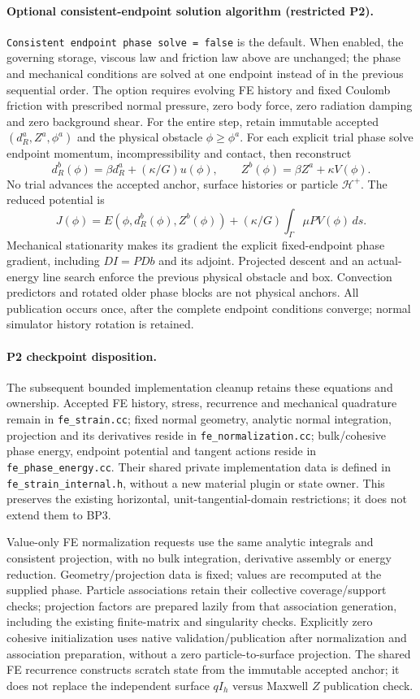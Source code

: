 \documentclass[11pt]{article}
\begin{document}
\paragraph{Optional consistent-endpoint solution algorithm (restricted P2).}
\texttt{Consistent endpoint phase solve = false} is the default. When enabled,
the governing storage, viscous law and friction law above are unchanged; the
phase and mechanical conditions are solved at one endpoint instead of in the
previous sequential order. The option requires evolving FE history and fixed
Coulomb friction with prescribed normal pressure, zero body force, zero radiation damping and
zero background shear. For the entire step, retain immutable accepted
$(d_R^a,Z^a,\phi^a)$ and the physical obstacle $\phi\ge\phi^a$. For each
explicit trial phase solve endpoint momentum, incompressibility and contact,
then reconstruct
\[
 d_R^b(\phi)=\beta d_R^a+(\kappa/G)u(\phi),\qquad
 Z^b(\phi)=\beta Z^a+\kappa V(\phi).
\]
No trial advances the accepted anchor, surface histories or particle
$\mathcal H^+$. The reduced potential is
\[
 J(\phi)=E(\phi,d_R^b(\phi),Z^b(\phi))+
       (\kappa/G)\int_\Gamma\mu P V(\phi)\,ds .
\]
Mechanical stationarity makes its gradient the explicit fixed-endpoint phase
gradient, including $D I=P D b$ and its adjoint. Projected descent and
an actual-energy line search enforce the previous physical obstacle and box.
Convection predictors and rotated older phase blocks are not physical anchors.
All publication occurs once, after the complete endpoint conditions converge;
normal simulator history rotation is retained.

\paragraph{P2 checkpoint disposition.}
The subsequent bounded implementation cleanup retains these equations and
ownership. Accepted FE history, stress, recurrence and mechanical quadrature
remain in \texttt{fe\_strain.cc}; fixed normal geometry, analytic normal
integration, projection and its derivatives reside in
\texttt{fe\_normalization.cc}; bulk/cohesive phase energy, endpoint potential
and tangent actions reside in \texttt{fe\_phase\_energy.cc}. Their shared private
implementation data is defined in \texttt{fe\_strain\_internal.h}, without a new
material plugin or state owner. This preserves the existing horizontal,
unit-tangential-domain restrictions; it does not extend them to BP3.

Value-only FE normalization requests use the same analytic integrals and
consistent projection, with no bulk integration, derivative assembly or energy
reduction. Geometry/projection data is fixed; values are recomputed at the
supplied phase. Particle associations retain their collective coverage/support
checks; projection factors are prepared lazily from that association generation,
including the existing finite-matrix and singularity checks. Explicitly zero
cohesive initialization uses native validation/publication after normalization
and association preparation, without a zero particle-to-surface projection.
The shared FE recurrence constructs scratch state from the immutable accepted
anchor; it does not replace the independent surface $q I_h$ versus Maxwell $Z$
publication check.
\end{document}
